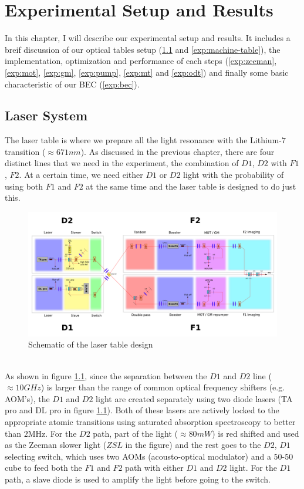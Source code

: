 \chapter{Experimental Setup and Results}

In this chapter, I will describe our experimental setup and results. It includes a breif discussion of our optical tables setup (\ref{exp:laser-table} and \ref{exp:machine-table}), the implementation, optimization and performance of each steps (\ref{exp:zeeman}, \ref{exp:mot}, \ref{exp:gm}, \ref{exp:pump}, \ref{exp:mt} and \ref{exp:odt}) and finally some basic characteristic of our BEC (\ref{exp:bec}).

\section{Laser System}\label{exp:laser-table}
The laser table is where we prepare all the light resonance with the Lithium-$7$ transition ($\approx671nm$). As discussed in the previous chapter, there are four distinct lines that we need in the experiment, the combination of $D1$, $D2$ with $F1$, $F2$. At a certain time, we need either $D1$ or $D2$ light with the probability of using both $F1$ and $F2$ at the same time and the laser table is designed to do just this.\\
\begin{figure}
  \begin{center}
    \includegraphics[width=14cm]{laser_table.png}
  \end{center}
  \caption{Schematic of the laser table design}
  \label{exp:laser-table-design}
\end{figure}\\
As shown in figure \ref{exp:laser-table-design}, since the separation between the $D1$ and $D2$ line ($\approx10GHz$) is larger than the range of common optical frequency shifters (e.g. AOM's), the $D1$ and $D2$ light are created separately using two diode lasers (TA pro and DL pro in figure \ref{exp:laser-table-design}). Both of these lasers are actively locked to the appropriate atomic transitions using saturated absorption spectroscopy to better than $2\text{MHz}$. For the $D2$ path, part of the light ($\approx80mW$) is red shifted and used as the Zeeman slower light ($ZSL$ in the figure) and the rest goes to the $D2$, $D1$ selecting switch, which uses two AOMs (acousto-optical modulator) and a $50$-$50$ cube to feed both the $F1$ and $F2$ path with either $D1$ and $D2$ light. For the $D1$ path, a slave diode is used to amplify the light before going to the switch.\\
